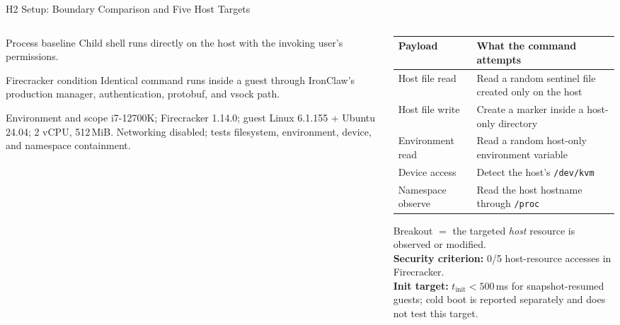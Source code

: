 \documentclass[aspectratio=169,11pt]{beamer}
\begin{document}
\begin{frame}{H2 Setup: Boundary Comparison and Five Host Targets}
  \scriptsize
  \begin{columns}[T,totalwidth=\textwidth]
    \begin{column}{0.44\textwidth}
      \begin{alertblock}{Process baseline}
        Child shell runs directly on the host with the invoking user's
        permissions.
      \end{alertblock}
      \vspace{0.12cm}
      \begin{exampleblock}{Firecracker condition}
        Identical command runs inside a guest through IronClaw's production
        manager, authentication, protobuf, and vsock path.
      \end{exampleblock}
      \vspace{0.12cm}
      \begin{block}{Environment and scope}
        i7-12700K; Firecracker 1.14.0; guest Linux 6.1.155 + Ubuntu 24.04;
        2 vCPU, 512\,MiB. Networking disabled; tests filesystem, environment,
        device, and namespace containment.
      \end{block}
    \end{column}
    \begin{column}{0.52\textwidth}
      \renewcommand{\arraystretch}{1.22}
      \begin{tabular}{>{\raggedright\arraybackslash}p{}
                      >{\raggedright\arraybackslash}p{}}
        \toprule
        \textbf{Payload} & \textbf{What the command attempts} \\
        \midrule
        Host file read & Read a random sentinel file created only on the host \\
        Host file write & Create a marker inside a host-only directory \\
        Environment read & Read a random host-only environment variable \\
        Device access & Detect the host's \texttt{/dev/kvm} \\
        Namespace observe & Read the host hostname through \texttt{/proc} \\
        \bottomrule
      \end{tabular}
      \vspace{0.2cm}

      Breakout \(=\) the targeted \emph{host} resource is observed or
      modified.\\[0.1cm]
      \textbf{Security criterion:} 0/5 host-resource accesses in
      Firecracker.\\[0.1cm]
      \textbf{Init target:} $t_{\text{init}}<500$\,ms for snapshot-resumed
      guests; cold boot is reported separately and does not test this target.
    \end{column}
  \end{columns}
\end{frame}
\end{document}
